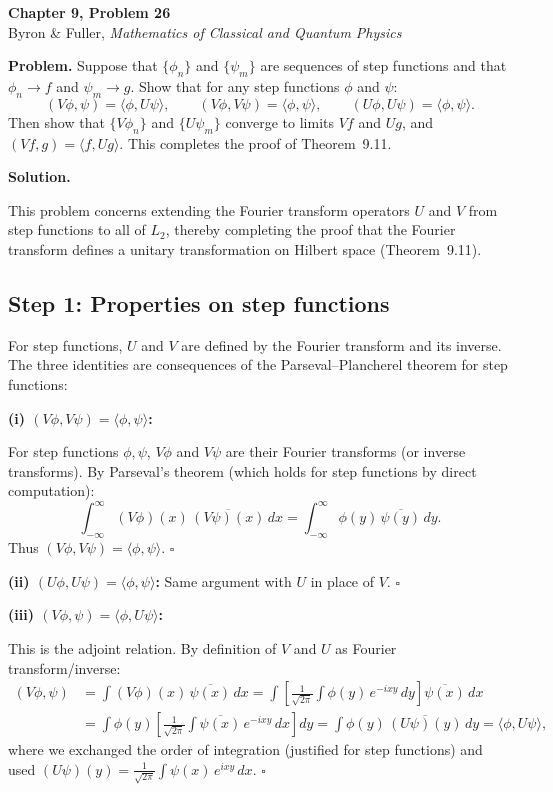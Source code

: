 \documentclass[12pt]{article}
\begin{document}
\begin{center}
{\Large\bfseries Chapter 9, Problem 26}\\[6pt]
Byron \& Fuller, \textit{Mathematics of Classical and Quantum Physics}
\end{center}

\bigskip

\textbf{Problem.} Suppose that $\{\phi_n\}$ and $\{\psi_m\}$ are sequences of step functions and that $\phi_n \to f$ and $\psi_m \to g$. Show that for any step functions $\phi$ and $\psi$:
\[
(V\phi, \psi) = \langle\phi, U\psi\rangle, \qquad (V\phi, V\psi) = \langle\phi, \psi\rangle, \qquad (U\phi, U\psi) = \langle\phi, \psi\rangle.
\]
Then show that $\{V\phi_n\}$ and $\{U\psi_m\}$ converge to limits $Vf$ and $Ug$, and $(Vf, g) = \langle f, Ug\rangle$. This completes the proof of Theorem~9.11.

\bigskip
\textbf{Solution.}

This problem concerns extending the Fourier transform operators $U$ and $V$ from step functions to all of $L_2$, thereby completing the proof that the Fourier transform defines a unitary transformation on Hilbert space (Theorem~9.11).

\subsection*{Step 1: Properties on step functions}

For step functions, $U$ and $V$ are defined by the Fourier transform and its inverse. The three identities are consequences of the Parseval--Plancherel theorem for step functions:

\textbf{(i) $(V\phi, V\psi) = \langle\phi, \psi\rangle$:}

For step functions $\phi, \psi$, $V\phi$ and $V\psi$ are their Fourier transforms (or inverse transforms). By Parseval's theorem (which holds for step functions by direct computation):
\[
\int_{-\infty}^{\infty} (V\phi)(x)\,\overline{(V\psi)(x)}\,dx = \int_{-\infty}^{\infty} \phi(y)\,\overline{\psi(y)}\,dy.
\]
Thus $(V\phi, V\psi) = \langle\phi, \psi\rangle$. \hfill $\square$

\textbf{(ii) $(U\phi, U\psi) = \langle\phi, \psi\rangle$:} Same argument with $U$ in place of $V$. \hfill $\square$

\textbf{(iii) $(V\phi, \psi) = \langle\phi, U\psi\rangle$:}

This is the adjoint relation. By definition of $V$ and $U$ as Fourier transform/inverse:
\begin{align}
(V\phi, \psi) &= \int (V\phi)(x)\,\overline{\psi(x)}\,dx = \int\left[\frac{1}{\sqrt{2\pi}}\int \phi(y)\,e^{-ixy}\,dy\right]\overline{\psi(x)}\,dx \\
&= \int \phi(y)\left[\frac{1}{\sqrt{2\pi}}\int \overline{\psi(x)}\,e^{-ixy}\,dx\right]dy = \int\phi(y)\,\overline{(U\psi)(y)}\,dy = \langle\phi, U\psi\rangle,
\end{align}
where we exchanged the order of integration (justified for step functions) and used $(U\psi)(y) = \frac{1}{\sqrt{2\pi}}\int \psi(x)\,e^{ixy}\,dx$. \hfill $\square$
\end{document}
